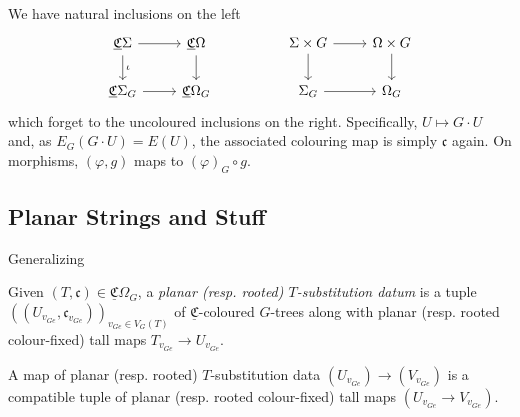 \documentclass[psamsfonts,onesided,10pt
,draft
]{amsart}%
\renewcommand{\phi}{\varphi}
\begin{document}

We have natural inclusions on the left
\begin{equation}
      \begin{tikzcd}
            \underline{\mathfrak C}\Sigma \arrow[d, "\iota"] \arrow[r]
            &
            \underline{\mathfrak C}\Omega \arrow[d]
            &&
            \Sigma \times G \arrow[d] \arrow[r]
            &
            \Omega \times G \arrow[d]
            \\
            \underline{\mathfrak C}\Sigma_G \arrow[r]
            &
            \underline{\mathfrak C}\Omega_G
            &&
            \Sigma_G \arrow[r]
            &
            \Omega_G
      \end{tikzcd}
\end{equation}
which forget to the uncoloured inclusions on the right.
Specifically, $U \mapsto G \cdot U$ and, as $E_G(G \cdot U) = E(U)$, the associated colouring map is simply $\mathfrak c$ again.
On morphisms, $(\phi,g)$ maps to $(\phi)_{G} \circ g$.

\subsection{Planar Strings and Stuff}

Generalizing \cite[Remark 3.78]{BP17}
\begin{definition}
      Given $(T,\mathfrak c) \in \underline{\mathfrak C}\Omega_G$, a
      \textit{planar (resp. rooted) $T$-substitution datum} is a tuple
      $((U_{v_{Ge}}, \mathfrak c_{v_{Ge}}))_{v_{Ge} \in V_G(T)}$ of $\underline{\mathfrak C}$-coloured $G$-trees along with
      planar (resp. rooted colour-fixed) tall maps
      $T_{v_{Ge}} \to U_{v_{Ge}}$.

      A map of planar (resp. rooted) $T$-substitution data $(U_{v_{Ge}}) \to (V_{v_{Ge}})$ is a compatible tuple of planar (resp. rooted colour-fixed) tall maps $(U_{v_{Ge}} \to V_{v_{Ge}})$. 
\end{definition}
\end{document}
